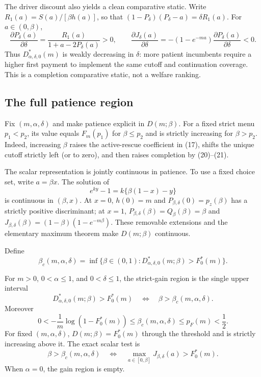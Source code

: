\documentclass[mnsc,blindrev]{informs3}
\begin{document}
The driver discount also yields a clean comparative static.  Write
$R_1(a)=S(a)/[\beta h(a)]$, so that
$(1-P_\delta)(P_\delta-a)=\delta R_1(a)$.  For
$a\in(0,\beta)$,
\[
 \frac{\partial P_\delta(a)}{\partial\delta}
 =\frac{R_1(a)}{1+a-2P_\delta(a)}>0,
 \qquad
 \frac{\partial J_\delta(a)}{\partial\delta}
 =-(1-e^{-ma})
 \frac{\partial P_\delta(a)}{\partial\delta}<0.            \tag{38a}
\]
Thus $D_{\alpha,\delta,0}^*(m)$ is weakly decreasing in $\delta$: more
patient incumbents require a higher first payment to implement the same
cutoff and continuation coverage.  This is a completion comparative static,
not a welfare ranking.

\subsection{The full patience region}

Fix $(m,\alpha,\delta)$ and make patience explicit in $D(m;\beta)$.  For a fixed
strict menu $p_1<p_2$, its value equals $F_m(p_1)$ for $\beta\le p_2$ and is
strictly increasing for $\beta>p_2$.  Indeed, increasing $\beta$ raises the active-rescue
coefficient in (17), shifts the unique cutoff strictly left (or to zero), and
then raises completion by (20)--(21).

The scalar representation is jointly continuous in patience.  To use a fixed
choice set, write $a=\beta x$.  The solution of
\[
 e^{ky}-1=k\{\beta(1-x)-y\}
\]
is continuous in $(\beta,x)$.  At $x=0$, $h(0)=m$ and
$P_{\beta,\delta}(0)=p_z(\beta)$ has a strictly positive discriminant; at
$x=1$, $P_{\beta,\delta}(\beta)=Q_\beta(\beta)=\beta$ and
$J_{\beta,\delta}(\beta)=(1-\beta)(1-e^{-m\beta})$.  These removable extensions and
the elementary maximum theorem make $D(m;\beta)$ continuous.

Define
\[
 \beta_c(m,\alpha,\delta)=
 \inf\{\beta\in(0,1):D_{\alpha,\delta,0}^*(m;\beta)>F_0^*(m)\}. \tag{39}
\]

\begin{theorem}
\label{thm:patience}
For $m>0$, $0<\alpha\le1$, and $0<\delta\le1$, the strict-gain region is the single upper
interval
\[
 D_{\alpha,\delta,0}^*(m;\beta)>F_0^*(m)
 \quad\Longleftrightarrow\quad
 \beta>\beta_c(m,\alpha,\delta).                           \tag{40}
\]
Moreover
\[
 0< -\frac1m\log(1-F_0^*(m))
 \le\beta_c(m,\alpha,\delta)\le p_F(m)<\frac12.           \tag{41}
\]
For fixed $(m,\alpha,\delta)$, $D(m;\beta)=F_0^*(m)$ through the threshold and is
strictly increasing above it.  The exact scalar test is
\[
 \beta>\beta_c(m,\alpha,\delta)
 \quad\Longleftrightarrow\quad
 \max_{a\in[0,\beta]}J_{\beta,\delta}(a)>F_0^*(m).        \tag{42}
\]
When $\alpha=0$, the gain region is empty.
\end{theorem}
\end{document}
